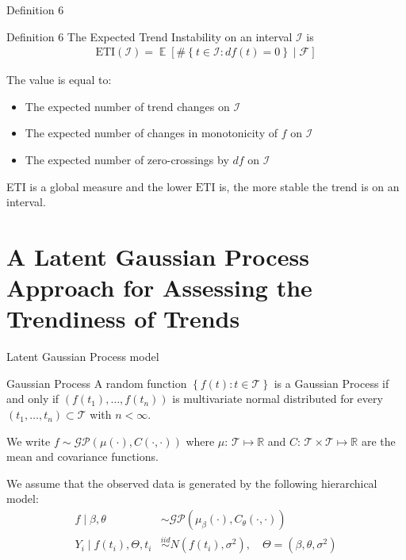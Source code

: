 \documentclass[ignorenonframetext,xcolor=pdflatex,table,dvipsnames,serif]{beamer}
\DeclareMathOperator{\E}{\mathbb{E}}
\begin{document}
\begin{frame}{Definition 6}
\begin{alertblock}{Definition 6}
  The \alert{Expected Trend Instability} on an interval $\mathcal{I}$ is
  \begin{align*}
    \mathrm{ETI}(\mathcal{I}) = \E[\#\left\{t \in \mathcal{I} : df(t) = 0\right\} \mid \mathcal{F}]
  \end{align*}
\end{alertblock}    
The value is equal to:
\begin{itemize}
  \item{The expected number of trend changes on $\mathcal{I}$}
  \item{The expected number of changes in monotonicity of $f$ on $\mathcal{I}$}  
  \item{The expected number of zero-crossings by $df$ on $\mathcal{I}$}
\end{itemize}
ETI is a global measure and the lower $\mathrm{ETI}$ is, the more stable the trend is on an interval.
\end{frame}

\section{A Latent Gaussian Process Approach for Assessing the Trendiness of Trends}

\begin{frame}{Latent Gaussian Process model}
\begin{alertblock}{Gaussian Process}
A random function $\left\{f(t) : t \in \mathcal{T}\right\}$ is a Gaussian Process if and only if $(f(t_1), \ldots, f(t_n))$ is multivariate normal distributed for every $(t_1, \ldots, t_n) \subset \mathcal{T}$ with $n < \infty$. 

We write $f \sim \mathcal{GP}(\mu(\cdot), C(\cdot, \cdot))$ where $\mu\colon\, \mathcal{T} \mapsto \mathbb{R}$ and $C\colon\, \mathcal{T} \times \mathcal{T} \mapsto \mathbb{R}$ are the mean and covariance functions.
\end{alertblock}

\pause

\vspace{1cm}

We assume that the observed data is generated by the following hierarchical model:
\begin{align*}
  f \mid \beta, \theta &\sim \mathcal{GP}(\mu_\beta(\cdot), C_\theta(\cdot,\cdot))\\
  Y_i \mid f(t_i), \Theta, t_i &\overset{iid}{\sim} N(f(t_i), \sigma^2), \quad \Theta = (\beta, \theta, \sigma^2)
\end{align*}
\end{frame}
\end{document}
